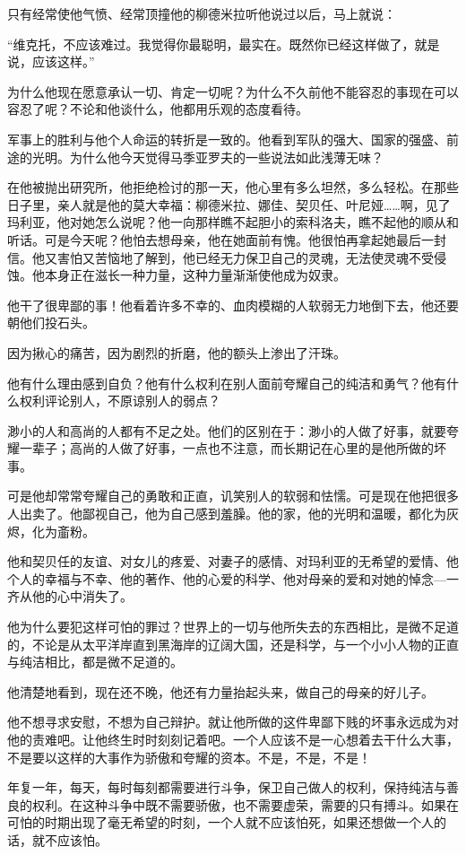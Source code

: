 只有经常使他气愤、经常顶撞他的柳德米拉听他说过以后，马上就说：

“维克托，不应该难过。我觉得你最聪明，最实在。既然你已经这样做了，就是说，应该这样。”

为什么他现在愿意承认一切、肯定一切呢？为什么不久前他不能容忍的事现在可以容忍了呢？不论和他谈什么，他都用乐观的态度看待。

军事上的胜利与他个人命运的转折是一致的。他看到军队的强大、国家的强盛、前途的光明。为什么他今天觉得马季亚罗夫的一些说法如此浅薄无味？

在他被抛出研究所，他拒绝检讨的那一天，他心里有多么坦然，多么轻松。在那些日子里，亲人就是他的莫大幸福：柳德米拉、娜佳、契贝任、叶尼娅……啊，见了玛利亚，他对她怎么说呢？他一向那样瞧不起胆小的索科洛夫，瞧不起他的顺从和听话。可是今天呢？他怕去想母亲，他在她面前有愧。他很怕再拿起她最后一封信。他又害怕又苦恼地了解到，他已经无力保卫自己的灵魂，无法使灵魂不受侵蚀。他本身正在滋长一种力量，这种力量渐渐使他成为奴隶。

他干了很卑鄙的事！他看着许多不幸的、血肉模糊的人软弱无力地倒下去，他还要朝他们投石头。

因为揪心的痛苦，因为剧烈的折磨，他的额头上渗出了汗珠。

他有什么理由感到自负？他有什么权利在别人面前夸耀自己的纯洁和勇气？他有什么权利评论别人，不原谅别人的弱点？

渺小的人和高尚的人都有不足之处。他们的区别在于：渺小的人做了好事，就要夸耀一辈子；高尚的人做了好事，一点也不注意，而长期记在心里的是他所做的坏事。

可是他却常常夸耀自己的勇敢和正直，讥笑别人的软弱和怯懦。可是现在他把很多人出卖了。他鄙视自己，他为自己感到羞臊。他的家，他的光明和温暖，都化为灰烬，化为齑粉。

他和契贝任的友谊、对女儿的疼爱、对妻子的感情、对玛利亚的无希望的爱情、他个人的幸福与不幸、他的著作、他的心爱的科学、他对母亲的爱和对她的悼念—一齐从他的心中消失了。

他为什么要犯这样可怕的罪过？世界上的一切与他所失去的东西相比，是微不足道的，不论是从太平洋岸直到黑海岸的辽阔大国，还是科学，与一个小小人物的正直与纯洁相比，都是微不足道的。

他清楚地看到，现在还不晚，他还有力量抬起头来，做自己的母亲的好儿子。

他不想寻求安慰，不想为自己辩护。就让他所做的这件卑鄙下贱的坏事永远成为对他的责难吧。让他终生时时刻刻记着吧。一个人应该不是一心想着去干什么大事，不是要以这样的大事作为骄傲和夸耀的资本。不是，不是，不是！

年复一年，每天，每时每刻都需要进行斗争，保卫自己做人的权利，保持纯洁与善良的权利。在这种斗争中既不需要骄傲，也不需要虚荣，需要的只有搏斗。如果在可怕的时期出现了毫无希望的时刻，一个人就不应该怕死，如果还想做一个人的话，就不应该怕。

